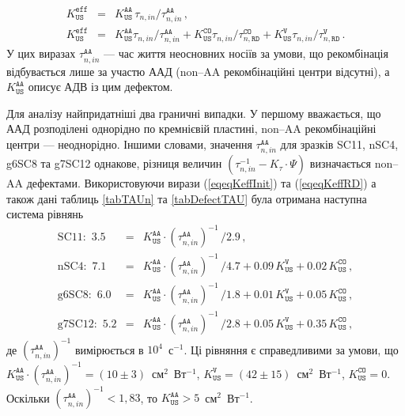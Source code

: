 \begin{eqnarray}
K_\mathtt{US}^\mathtt{eff}&=&K_\mathtt{US}^\mathtt{AA}\,\tau_{n,in}/\tau_{n,in}^\mathtt{AA}\,,\label{eqeqKeffInit}\\
K_\mathtt{US}^\mathtt{eff}&=&K_\mathtt{US}^\mathtt{AA}\tau_{n,in}/\tau_{n,in}^\mathtt{AA}+
                           K_\mathtt{US}^\mathtt{CO}\tau_{n,in}/\tau_{n,\mathtt{RD}}^\mathtt{CO}+
                           K_\mathtt{US}^\mathtt{V}\tau_{n,in}/\tau_{n,\mathtt{RD}}^\mathtt{V} \,.\label{eqeqKeffRD}
\end{eqnarray}
У цих виразах $\tau_{n,in}^\mathtt{AA}$ --- час життя неосновних носіїв за умови, що рекомбінація
відбувається лише за участю ААД (non--AA рекомбінаційні центри відсутні),
а $K_\mathtt{US}^\mathtt{AA}$ описує АДВ із цим дефектом.

Для аналізу найпридатніші два граничні випадки.
У першому вважається,
що ААД розподілені однорідно по кремнієвій пластині,
non--AA рекомбінаційні центри --- неоднорідно.
Іншими словами,
значення $\tau_{n,in}^\mathtt{AA}$ для зразків SC11, nSC4, g6SC8 та g7SC12
однакове, різниця величин
$(\tau_{n,in}^{-1}-K_\tau\cdot\Psi)$ визначається non--AA дефектами.
Використовуючи вирази (\ref{eqeqKeffInit}) та (\ref{eqeqKeffRD}) а також
дані таблиць \ref{tabTAUn} та \ref{tabDefectTAU}
була отримана наступна система рівнянь
\begin{eqnarray}
\mbox{SC11}:\,\,3.5&=&K_\mathtt{US}^\mathtt{AA}\cdot(\tau_{n,in}^\mathtt{AA})^{-1}\,/2.9\,,\nonumber\\
\mbox{nSC4}:\,\,7.1&=&K_\mathtt{US}^\mathtt{AA}\cdot(\tau_{n,in}^\mathtt{AA})^{-1}\,/4.7+0.09\,K_\mathtt{US}^\mathtt{V}+0.02\,K_\mathtt{US}^\mathtt{CO}\,,\nonumber\\
\mbox{g6SC8}:\,\,6.0&=&K_\mathtt{US}^\mathtt{AA}\cdot(\tau_{n,in}^\mathtt{AA})^{-1}\,/1.8+0.01\,K_\mathtt{US}^\mathtt{V}+0.05\,K_\mathtt{US}^\mathtt{CO}\,,\nonumber\\
\mbox{g7SC12}:\,\,5.2&=&K_\mathtt{US}^\mathtt{AA}\cdot(\tau_{n,in}^\mathtt{AA})^{-1}\,/2.8+0.05\,K_\mathtt{US}^\mathtt{V}+0.35\,K_\mathtt{US}^\mathtt{CO}\,,\nonumber
\end{eqnarray}
де
$(\tau_{n,in}^\mathtt{AA})^{-1}$ вимірюється в $10^4$~с$^{-1}$.
Ці рівняння є справедливими за умови, що
$K_\mathtt{US}^\mathtt{AA}\cdot(\tau_{n,in}^\mathtt{AA})^{-1}=(10\pm3)$~см$^2$~Вт$^{-1}$,
$K_\mathtt{US}^\mathtt{V}=(42\pm15)$~см$^2$~Вт$^{-1}$,
$K_\mathtt{US}^\mathtt{CO}=0$.
Оскільки  $(\tau_{n,in}^\mathtt{AA})^{-1}<1,83$,
то $K_\mathtt{US}^\mathtt{AA}>5$~см$^2$~Вт$^{-1}$.

